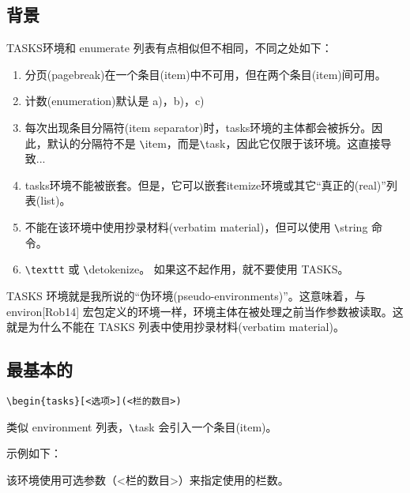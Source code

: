 \documentclass[a4paper,12pt,indent]{article}
\begin{document}
\subsection{背景}

\textcolor{Tasks}{TASKS}环境和 enumerate 列表有点相似但不相同，不同之处如下：
\begin{enumerate}
    \item 分页(pagebreak)在一个条目(item)中不可用，但在两个条目(item)间可用。

    \item 计数(enumeration)默认是 a)，b)，c)

    \item 每次出现条目分隔符(item separator)时，tasks环境的主体都会被拆分。因此，默认的分隔符不是 \verb|\|\textcolor{Tasks}{item}，而是\verb|\|\textcolor{Tasks}{task}，因此它仅限于该环境。这直接导致...

    \item tasks环境不能被嵌套。但是，它可以嵌套itemize环境或其它“真正的(real)”列表(list)。

    \item 不能在该环境中使用抄录材料(verbatim material)，但可以使用 \verb|\|\textcolor{Tasks}{string} 命令。

    \item \verb|\texttt| 或 \verb|\|\textcolor{Tasks}{detokenize}。 如果这不起作用，就不要使用 \textcolor{Tasks}{TASKS}。

\end{enumerate}

\begin{tcolorbox}[arc=3mm,boxrule=1pt,colframe=red!75!black,colback=white]
   \textcolor{Tasks}{TASKS} 环境就是我所说的“伪环境(pseudo-environments)”。这意味着，与 environ[Rob14] 宏包定义的环境一样，环境主体在被处理之前当作参数被读取。这就是为什么不能在 \textcolor{Tasks}{TASKS} 列表中使用抄录材料(verbatim material)。
\end{tcolorbox}

\subsection{最基本的}
\verb|\begin{tasks}[<选项>](<栏的数目>)|

类似 environment 列表，\verb|\|\textcolor{Tasks}{task} 会引入一个条目(item)。

示例如下：

该环境使用可选参数（<栏的数目>）来指定使用的栏数。
\end{document}
